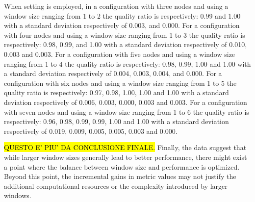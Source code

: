When \average setting is employed, in a configuration with three nodes and using a window size ranging from 1 to 2 the quality ratio is respectively: 0.99 and 1.00 with a standard deviation respectively of 0.003, and 0.000.
For a configuration with four nodes and using a window size ranging from 1 to 3 the quality ratio is respectively:
0.98, 0.99, and 1.00 with a standard deviation respectively of 0.010, 0.003 and 0.003. For a configuration with five nodes and using a window size ranging from 1 to 4 the quality ratio is respectively:
0.98, 0.99, 1.00 and 1.00 with a standard deviation respectively of 0.004, 0.003, 0.004, and 0.000. For a configuration with six nodes and using a window size ranging from 1 to 5 the quality ratio is respectively:
0.97, 0.98, 1.00, 1.00 and 1.00 with a standard deviation respectively of 0.006, 0.003, 0.000, 0.003 and 0.003. For a configuration with seven nodes and using a window size ranging from 1 to 6  the quality ratio is respectively:
0.96, 0.98, 0.99, 0.99, 1.00 and 1.00 with a standard deviation respectively of 0.019, 0.009, 0.005, 0.005, 0.003 and 0.000.




\hl{QUESTO E' PIU' DA CONCLUSIONE FINALE.} Finally, the data suggest that while larger window sizes generally lead to better performance, there might exist a point where the balance between window size and performance is optimized. Beyond this point, the incremental gains in metric values may not justify the additional computational resources or the complexity introduced by larger windows.


